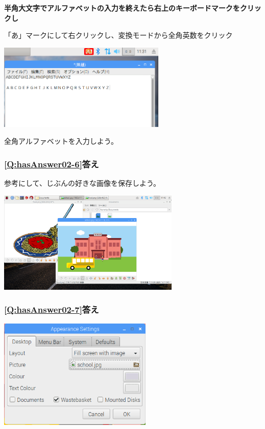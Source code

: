 \documentclass[a4paper,12pt]{jarticle}
\begin{document}
\bigskip

{\bfseries
  半角大文字でアルファベットの入力を終えたら右上のキーボードマークをクリックし

  「あ」マークにして右クリックし、変換モードから全角英数をクリック}



\bigskip

\bigskip


\centering
\includegraphics[width=0.6\textwidth]{textbook-img220.png}
\flushleft

\bigskip

全角アルファベットを入力しよう。
\clearpage

\subsubsection{\bfseries
\ref*{Q:hasAnswer02-6}答え}

参考にして、じぶんの好きな画像を保存しよう。

\centering
\includegraphics[width=0.65\textwidth]{textbook-img221.png}
\flushleft

\bigskip


\subsubsection{\bfseries
\ref*{Q:hasAnswer02-7}答え}



\centering
\includegraphics[width=0.55\textwidth]{textbook-img222.png}
\end{document}
